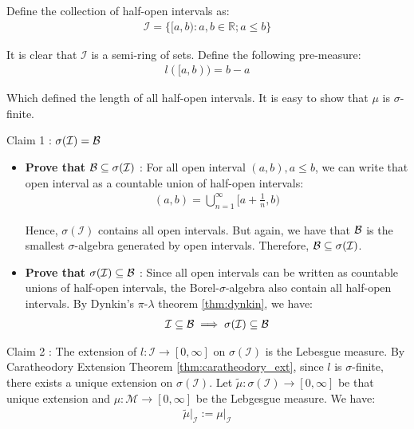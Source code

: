 \begin{proof*}
    Define the collection of half-open intervals as:
    \begin{align*}
        \mathcal{I} = \Big\{ [a, b) : a, b\in\mathbb{R}; a\le b \Big\}
    \end{align*}

    \noindent It is clear that $\mathcal{I}$ is a semi-ring of sets. Define the following pre-measure:
    \begin{align*}
        l([a, b)) = b - a
    \end{align*}

    \noindent Which defined the length of all half-open intervals. It is easy to show that $\mu$ is $\sigma$-finite.

    \begin{subproof}{\newline Claim 1 : $\sigma(\mathcal{I}) = \borel$}
        \begin{itemize}
            \item \textbf{Prove that $\borel \subseteq \sigma(\mathcal{I})$} : For all open interval $(a, b), a\le b$, we can write that open interval as a countable union of half-open intervals:
            \begin{align*}
                (a, b) = \bigcup_{n=1}^\infty \Bigg[a + \frac{1}{n}, b \Bigg)
            \end{align*}

            \noindent Hence, $\sigma(\mathcal{I})$ contains all open intervals. But again, we have that $\borel$ is the smallest $\sigma$-algebra generated by open intervals. Therefore, $\borel \subseteq \sigma(\mathcal{I})$.\newline

            \item \textbf{Prove that $\sigma(\mathcal{I}) \subseteq \borel$} : Since all open intervals can be written as countable unions of half-open intervals, the Borel-$\sigma$-algebra also contain all half-open intervals. By Dynkin's $\pi$-$\lambda$ theorem \ref{thm:dynkin}, we have:
            \begin{align*}
                \mathcal{I} \subseteq \borel \implies \sigma(\mathcal{I}) \subseteq \borel
            \end{align*}
        \end{itemize}
    \end{subproof}

    \begin{subproof}{\newline Claim 2 : The extension of $l:\mathcal{I}\to[0,\infty]$ on $\sigma(\mathcal{I})$ is the Lebesgue measure.}
        By Caratheodory Extension Theorem \ref{thm:caratheodory_ext}, since $l$ is $\sigma$-finite, there exists a unique extension on $\sigma(\mathcal{I})$. Let $\tilde\mu:\sigma(\mathcal{I})\to[0,\infty]$ be that unique extension and $\mu:\mathcal{M}\to[0,\infty]$ be the Lebgesgue measure. We have:
        \begin{align*}
            \tilde\mu\Big|_{\mathcal{I}} := \mu\Big|_{\mathcal{I}} 
        \end{align*}


\end{subproof}
\end{proof*}
